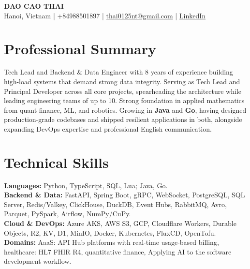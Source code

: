 \documentclass[9pt,a4paper]{extarticle}
\begin{document}
  \begin{center}
      {\LARGE\textbf{DAO CAO THAI}}\\[3pt]
      Hanoi, Vietnam \;|\; +84988501897 \;|\;
      \href{mailto:thai0125nt@gmail.com}{thai0125nt@gmail.com}
      \;|\;
      \href{https://www.linkedin.com/in/đào-thái-08293b168/}{LinkedIn}
  \end{center}
\section*{Professional Summary}
Tech Lead and Backend \& Data Engineer with 8 years of experience building high-load systems that demand strong data integrity. Serving as Tech Lead and Principal Developer across all core projects, spearheading the architecture while leading engineering teams of up to 10.
Strong foundation in applied mathematics from quant finance, ML, and robotics. Growing in \textbf{Java} and \textbf{Go}, having designed production-grade codebases and shipped resilient applications in both, alongside expanding DevOps expertise and professional English communication.
  \section*{Technical Skills}
  \textbf{Languages:} Python, TypeScript, SQL, Lua; Java, Go.\\
  \textbf{Backend \& Data:} FastAPI, Spring Boot, gRPC, WebSocket, PostgreSQL, SQL Server,
  Redis/Valkey, ClickHouse, DuckDB, Event Hubs, RabbitMQ, Avro, Parquet, PySpark, Airflow,
  NumPy/CuPy.\\
  \textbf{Cloud \& DevOps:} Azure AKS, AWS S3, GCP, Cloudflare Workers, Durable Objects, R2, KV,
  D1, MinIO, Docker, Kubernetes, FluxCD, OpenTofu.\\
  \textbf{Domains:} AaaS: API Hub platforms with real-time usage-based billing, healthcare: HL7 FHIR R4, quantitative finance, Applying AI to the software development workflow.
\end{document}
